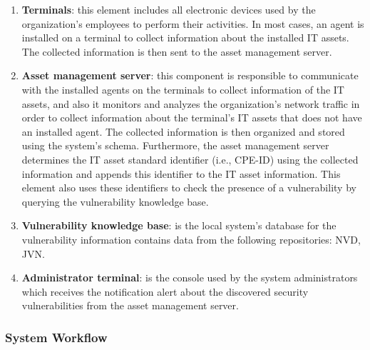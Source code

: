 \documentclass{llncs}
\begin{document}
 \begin{enumerate}
 \item \textbf{Terminals}: this element includes all electronic devices used by the organization's employees to perform their  activities. In most cases, an agent is installed on a terminal to collect information about the installed IT assets. The collected information is then sent to the asset management server.
 
 \item \textbf{Asset management server}: this component is responsible to communicate with the installed agents on the terminals to collect information of the IT assets, and also it monitors and analyzes the organization's network traffic in order to collect information about the terminal's IT assets that does not have an installed agent. The collected information is then organized and stored using the system's schema. Furthermore, the asset management server determines the IT asset standard identifier (i.e., CPE-ID) using the collected information and appends this identifier to the  IT asset information. This element also uses these identifiers to check the presence of a vulnerability by querying the vulnerability knowledge base.
 
 \item \textbf{Vulnerability knowledge base}: is the local system's database for the vulnerability information contains data from  the following repositories: NVD, JVN.
 
 
  \item \textbf{Administrator terminal}: is the console used by the system administrators which receives the notification alert about the discovered security vulnerabilities from the asset management server.     
 \end{enumerate}
 

\subsubsection{System Workflow }
\end{document}
